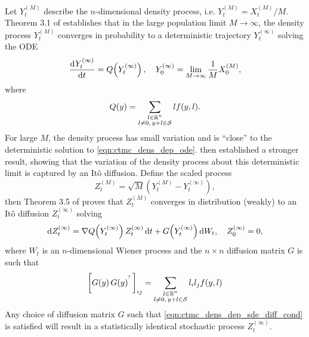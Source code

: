 Let \(Y_t^{(M)}\) describe the \(n\)-dimensional density process, i.e. \(Y_t^{(M)} = X_t^{(M)} / M\).
Theorem 3.1 of \citet{Kurtz_1970_SolutionsOrdinaryDifferential} establishes that in the large population limit \(M \to \infty\), the density process \(Y_t^{(M)}\) converges in probability to a deterministic trajectory \(Y_t^{(\infty)}\) solving the ODE
\begin{equation}
	\dod{Y_t^{(\infty)}}{t} = Q\!\left(Y_t^{(\infty)}\right), \quad Y_0^{(\infty)} = \lim_{M\to\infty}\frac1M X^{(M)}_0,
	\label{eqn:ctmc_dens_dep_ode}
\end{equation}
where
\[
	Q\!\left(y\right) = \sum_{\substack{l \in \mathbb{R}^n \\ l \neq 0,\, y + l \in \mathcal{S}}}{l f\!\left(y, l\right)}.
\]
For large \(M\), the density process has small variation and is ``close'' to the deterministic solution to \cref{eqn:ctmc_dens_dep_ode}.
\citet{Kurtz_1971_LimitTheoremsSequences} then established a stronger result, showing that the variation of the density process about this deterministic limit is captured by an It\^o diffusion.
Define the scaled process
\[
	Z_t^{(M)} = \sqrt{M}\left(Y_t^{(M)} - Y_{t}^{(\infty)}\right),
\]
then Theorem 3.5 of \citet{Kurtz_1971_LimitTheoremsSequences} proves that \(Z_t^{(M)}\) converges in distribution (weakly) to an It\^o diffusion \(Z_t^{(\infty)}\) solving
\begin{equation}
	\dif Z_t^{(\infty)} = \nabla Q\!\left(Y_t^{(\infty)}\right) Z_t^{(\infty)}\dif t + G\!\left(Y_t^{(\infty)}\right)\dif W_t, \quad Z_0^{(\infty)} = 0,
	\label{eqn:ctmc_dens_dep_sde}
\end{equation}
where \(W_t\) is an \(n\)-dimensional Wiener process and the \(n \times n\) diffusion matrix \(G\) is such that
\begin{equation}
	\left[G\!\left(y\right)G\!\left(y\right)^{^{\!\top}}\right]_{ij} = \sum_{\substack{l \in \mathbb{R}^n \\ l \neq 0,\, y + l \in \mathcal{S}}}{l_i l_j f\!\left(y,l\right)}
	\label{eqn:ctmc_dens_dep_sde_diff_cond}
\end{equation}
Any choice of diffusion matrix \(G\) such that \cref{eqn:ctmc_dens_dep_sde_diff_cond} is satisfied will result in a statistically identical stochastic process \(Z_t^{(\infty)}\).


